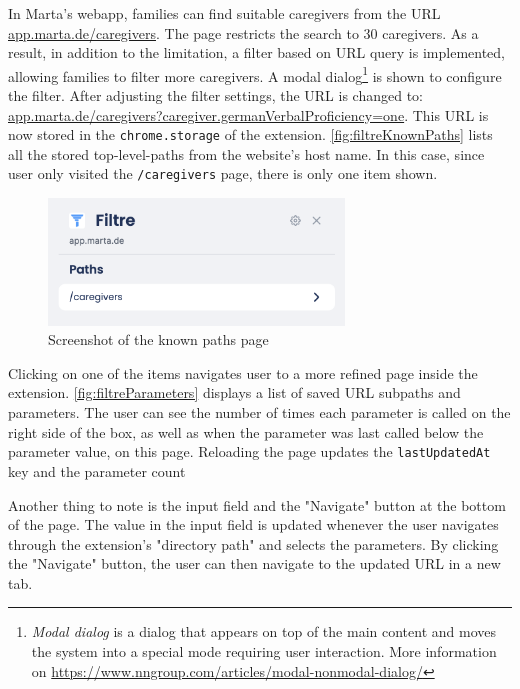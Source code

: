 In Marta's webapp, families can find suitable caregivers from the URL \url{app.marta.de/caregivers}. The page restricts the search to 30 caregivers. As a result, in addition to the limitation, a filter based on URL query is implemented, allowing families to filter more caregivers. A modal dialog\footnote{\emph{Modal dialog} is a dialog that appears on top of the main content and moves the system into a special mode requiring user interaction. More information on \url{https://www.nngroup.com/articles/modal-nonmodal-dialog/}} is shown to configure the filter. After adjusting the filter settings, the URL is changed to: \url{app.marta.de/caregivers?caregiver.germanVerbalProficiency=one}. This URL is now stored in the \texttt{chrome.storage} of the extension. \autoref{fig:filtreKnownPaths} lists all the stored top-level-paths from the website's host name. In this case, since user only visited the \texttt{/caregivers} page, there is only one item shown.

\begin{figure}[H]
  \centering
  \includegraphics[width=0.7\textwidth]{assets/screenshot_filtre_known_paths.png}
  \caption{Screenshot of the known paths page}
  \label{fig:filtreKnownPaths}
\end{figure}

Clicking on one of the items navigates user to a more refined page inside the extension. \autoref{fig:filtreParameters} displays a list of saved URL subpaths and parameters. The user can see the number of times each parameter is called on the right side of the box, as well as when the parameter was last called below the parameter value, on this page. Reloading the page updates the \texttt{lastUpdatedAt} key and the parameter count

Another thing to note is the input field and the "Navigate" button at the bottom of the page. The value in the input field is updated whenever the user navigates through the extension's "directory path" and selects the parameters. By clicking the "Navigate" button, the user can then navigate to the updated URL in a new tab.

